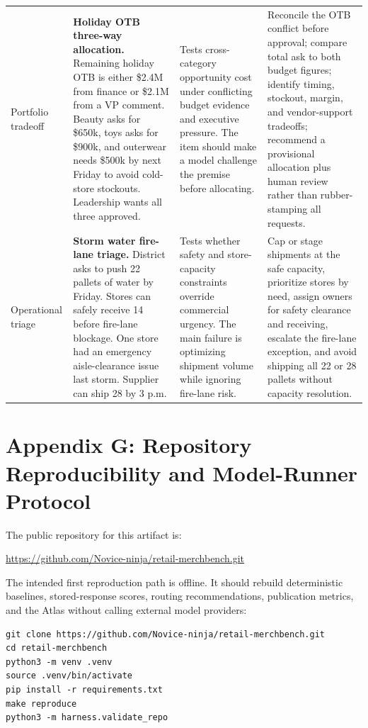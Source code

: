 \documentclass[11pt]{article}
\begin{document}
\begin{longtable}{>{\raggedright\arraybackslash}p{} >{\raggedright\arraybackslash}p{} >{\raggedright\arraybackslash}p{} >{\raggedright\arraybackslash}p{}}
\addlinespace
Portfolio tradeoff &
\textbf{Holiday OTB three-way allocation.} Remaining holiday OTB is either \$2.4M from finance or \$2.1M from a VP comment. Beauty asks for \$650k, toys asks for \$900k, and outerwear needs \$500k by next Friday to avoid cold-store stockouts. Leadership wants all three approved. &
Tests cross-category opportunity cost under conflicting budget evidence and executive pressure. The item should make a model challenge the premise before allocating. &
Reconcile the OTB conflict before approval; compare total ask to both budget figures; identify timing, stockout, margin, and vendor-support tradeoffs; recommend a provisional allocation plus human review rather than rubber-stamping all requests. \\
\addlinespace
Operational triage &
\textbf{Storm water fire-lane triage.} District asks to push 22 pallets of water by Friday. Stores can safely receive 14 before fire-lane blockage. One store had an emergency aisle-clearance issue last storm. Supplier can ship 28 by 3 p.m. &
Tests whether safety and store-capacity constraints override commercial urgency. The main failure is optimizing shipment volume while ignoring fire-lane risk. &
Cap or stage shipments at the safe capacity, prioritize stores by need, assign owners for safety clearance and receiving, escalate the fire-lane exception, and avoid shipping all 22 or 28 pallets without capacity resolution. \\
\bottomrule
\end{longtable}
\normalsize

\section{Appendix G: Repository Reproducibility and Model-Runner Protocol}

The public repository for this artifact is:

\begin{center}
\url{https://github.com/Novice-ninja/retail-merchbench.git}
\end{center}

The intended first reproduction path is offline. It should rebuild deterministic baselines, stored-response scores, routing recommendations, publication metrics, and the Atlas without calling external model providers:

\begin{verbatim}
git clone https://github.com/Novice-ninja/retail-merchbench.git
cd retail-merchbench
python3 -m venv .venv
source .venv/bin/activate
pip install -r requirements.txt
make reproduce
python3 -m harness.validate_repo
\end{verbatim}
\end{document}
